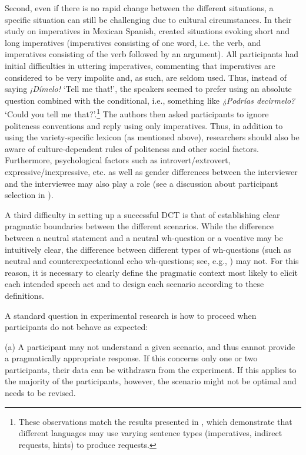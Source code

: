 \documentclass[output=paper]{LSP/langsci}
\begin{document}
Second, even if there is no rapid change between the different situations, a specific situation can still be challenging due to cultural circumstances. In their study on imperatives in Mexican Spanish, \citet{Brehm2014} created situations evoking short and long imperatives (imperatives consisting of one word, i.e. the verb, and imperatives consisting of the verb followed by an argument). All participants had initial difficulties in uttering imperatives, commenting that imperatives are considered to be very impolite and, as such, are seldom used. Thus, instead of saying \textit{¡Dímelo!} ‘Tell me that!’, the speakers seemed to prefer using an absolute question combined with the conditional, i.e., something like \textit{¿Podrías decirmelo?} ‘Could you tell me that?’.\footnote{These observations match the results presented in \citet{BlumKulka1989}, which demonstrate that different languages may use varying sentence types (imperatives, indirect requests, hints) to produce requests.} The authors then asked participants to ignore politeness conventions and reply using only imperatives. Thus, in addition to using the variety-specific lexicon (as mentioned above), researchers should also be aware of culture-dependent rules of politeness and other social factors. Furthermore, psychological factors such as introvert/extrovert, expressive/inexpressive, etc. as well as gender differences between the interviewer and the interviewee may also play a role (see a discussion about participant selection in \citealt[22--23]{Niebuhr2015}).

A third difficulty in setting up a successful DCT is that of establishing clear pragmatic boundaries between the different scenarios. While the difference between a neutral statement and a neutral wh-question or a vocative may be intuitively clear, the difference between different types of wh-questions (such as neutral and counterexpectational echo wh-questions; see, e.g., \citealt{Huttenlauch2016}) may not. For this reason, it is necessary to clearly define the pragmatic context most likely to elicit each intended speech act and to design each scenario according to these definitions.

A standard question in experimental research is how to proceed when par\-ti\-ci\-pants do not behave as expected: 

(a) A participant may not understand a given scenario, and thus cannot provide a pragmatically appropriate response. If this concerns only one or two participants, their data can be withdrawn from the experiment. If this applies to the majority of the par\-ti\-ci\-pants, however, the scenario might not be optimal and needs to be revised. 
\end{document}
